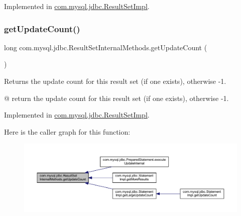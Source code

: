 Implemented in \mbox{\hyperlink{classcom_1_1mysql_1_1jdbc_1_1_result_set_impl_ab197af35d136130f30ba471848e1737d}{com.\+mysql.\+jdbc.\+Result\+Set\+Impl}}.

\mbox{\label{interfacecom_1_1mysql_1_1jdbc_1_1_result_set_internal_methods_ae143240bc7e0d1553f6fec904bbf0170}} 
\subsubsection{\texorpdfstring{get\+Update\+Count()}{getUpdateCount()}}
{\footnotesize\ttfamily long com.\+mysql.\+jdbc.\+Result\+Set\+Internal\+Methods.\+get\+Update\+Count (\begin{DoxyParamCaption}{ }\end{DoxyParamCaption})}

Returns the update count for this result set (if one exists), otherwise -\/1.

@ return the update count for this result set (if one exists), otherwise -\/1. 

Implemented in \mbox{\hyperlink{classcom_1_1mysql_1_1jdbc_1_1_result_set_impl_a7684c3389d3860adfc608fdcb8a0d40d}{com.\+mysql.\+jdbc.\+Result\+Set\+Impl}}.

Here is the caller graph for this function\+:
\nopagebreak
\begin{figure}[H]
\begin{center}
\leavevmode
\includegraphics[width=350pt]{interfacecom_1_1mysql_1_1jdbc_1_1_result_set_internal_methods_ae143240bc7e0d1553f6fec904bbf0170_icgraph}
\end{center}
\end{figure}
\mbox{\label{interfacecom_1_1mysql_1_1jdbc_1_1_result_set_internal_methods_ae53e8a9c6f65d29a46883ba31b41ace2}} 

